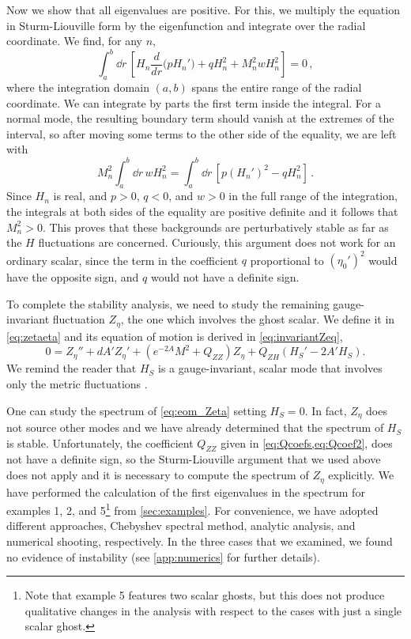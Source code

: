 Now we show that all eigenvalues are positive.
For this, we multiply the equation in Sturm-Liouville form by the eigenfunction and integrate over the radial coordinate.
We find, for any $n$,
\begin{equation}
	\int_a^b  \dd r \, \left[H_n\frac{d}{dr}\Big(p H_n'\Big)+q H_n^2+M_n^2 w H_n^2\right]=0\,,
\end{equation}
where the integration domain $(a,b)$ spans the entire range of the radial coordinate.
We can integrate by parts the first term inside the integral.
For a normal mode, the resulting boundary term should vanish at the extremes of the interval, so after moving some terms to the other side of the equality, we are left with
\begin{equation}
	M_n^2\int_a^b  \dd r \, w H_n^2=\int_a^b  \dd r \, \left[p (H_n')^2-q H_n^2\right]\,.
\end{equation}
Since $H_n$ is real, and $p>0$, $q<0$, and $w>0$ in the full range of the integration, the integrals at both sides of the equality are positive definite and it follows that $M_n^2>0$.
This proves that these backgrounds are perturbatively stable as far as the $H$ fluctuations are concerned.
Curiously, this argument does not work for an ordinary scalar, since the term in the coefficient $q$ proportional to $(\eta_0')^2$ would have the opposite sign, and $q$ would not have a definite sign.

To complete the stability analysis, we need to study the remaining gauge-invariant fluctuation $Z_\eta$, the one which involves the ghost scalar.
We define it in \cref{eq:zetaeta} and its equation of motion is derived in \cref{eq:invariantZeq},
\begin{equation}
	\label{eq:eom_Zeta}
	0=Z_\eta''+dA' Z_\eta'+\left(e^{-2A}M^2+Q_{ZZ}\right)Z_\eta+Q_{ZH}(H_S'-2A' H_S).
\end{equation}
We remind the reader that $H_S$ is a gauge-invariant, scalar mode that involves only the metric fluctuations . 

One can study the spectrum of \cref{eq:eom_Zeta} setting $H_S=0$.
In fact, $Z_\eta$ does not source other modes and we have already determined that the spectrum of $H_S$ is stable.
Unfortunately, the coefficient $Q_{ZZ}$ given in \cref{eq:Qcoefs,eq:Qcoef2}, does not have a definite sign, so the Sturm-Liouville argument that we used above does not apply and it is necessary to compute the spectrum of $Z_\eta$ explicitly.
We have performed the calculation of the first eigenvalues in the spectrum for examples 1, 2, and 5\footnote{Note that example 5 features two scalar ghosts, but this does not produce qualitative changes in the analysis with respect to the cases with just a single scalar ghost.} from \cref{sec:examples}.
For convenience, we have adopted different approaches, Chebyshev spectral method, analytic analysis, and numerical shooting, respectively.
In the three cases that we examined, we found no evidence of instability (see \cref{app:numerics} for further details).


